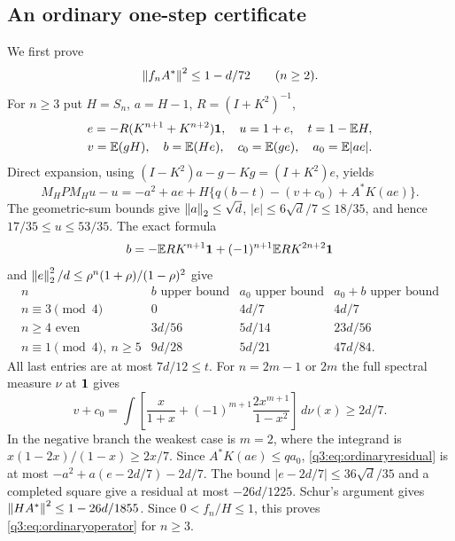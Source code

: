 \subsection{An ordinary one-step certificate}
We first prove
\begin{equation}\label{q3:eq:ordinaryoperator}
 \left\lVert f_nA^*\right\rVert^2\le1-d/72\qquad(n\ge2).
\end{equation}
For $n\ge3$ put $H=S_n$, $a=H-1$, $R=(I+K^2)^{-1}$,
\[
 \begin{gathered}
 e=-R(K^{n+1}+K^{n+2})\mathbf1,\quad u=1+e,\quad t=1-\mathbb E H,\\
 v=\mathbb E(gH),\quad b=\mathbb E(He),\quad c_0=\mathbb E(ge),\quad a_0=\mathbb E|ae|.
 \end{gathered}
\]
Direct expansion, using $(I-K^2)a-g-Kg=(I+K^2)e$, yields
\begin{equation}\label{q3:eq:ordinaryresidual}
 M_HP M_Hu-u=-a^2+ae+H\{q(b-t)-(v+c_0)+A^*K(ae)\}.
\end{equation}
The geometric-sum bounds give $\left\lVert a\right\rVert_2\le\sqrt d$, $|e|\le6\sqrt d/7\le18/35$, and hence $17/35\le u\le53/35$. The exact formula
\[
 b=-\mathbb E RK^{n+1}\mathbf1+(-1)^{n+1}\mathbb E RK^{2n+2}\mathbf1
\]
and $\left\lVert e\right\rVert_2^2/d\le\rho^n(1+\rho)/(1-\rho)^2$ give
\[
\begin{array}{c|c|c|c}
n&b\text{ upper bound}&a_0\text{ upper bound}&a_0+b\text{ upper bound}\\\hline
n\equiv3\pmod4&0&4d/7&4d/7\\
n\ge4\text{ even}&3d/56&5d/14&23d/56\\
n\equiv1\pmod4,\ n\ge5&9d/28&5d/21&47d/84 .
\end{array}
\]
All last entries are at most $7d/12\le t$. For $n=2m-1$ or $2m$ the full spectral measure $\nu$ at $\mathbf1$ gives
\[
 v+c_0=\int\left[\frac{x}{1+x}
       +(-1)^{m+1}\frac{2x^{m+1}}{1-x^2}\right]\,d\nu(x)\ge2d/7.
\]
In the negative branch the weakest case is $m=2$, where the integrand is $x(1-2x)/(1-x)\ge2x/7$. Since $A^*K(ae)\le qa_0$, \eqref{q3:eq:ordinaryresidual} is at most
$-a^2+a(e-2d/7)-2d/7$. The bound $|e-2d/7|\le36\sqrt d/35$ and a completed square give a residual at most $-26d/1225$. Schur's argument gives
$\left\lVert HA^*\right\rVert^2\le1-26d/1855$. Since $0<f_n/H\le1$, this proves \eqref{q3:eq:ordinaryoperator} for $n\ge3$.

